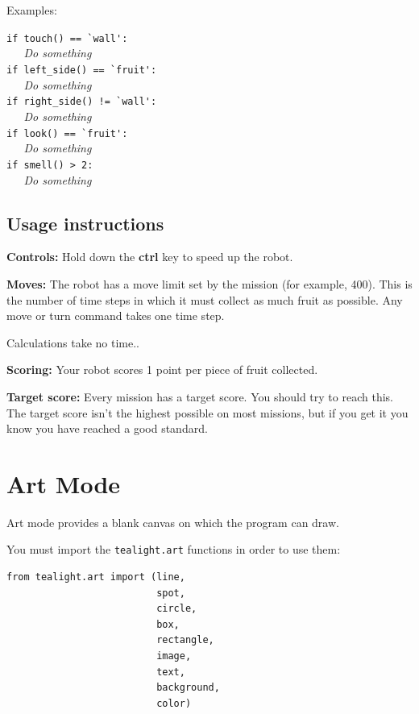 \documentclass[12pt,a4paper,twoside]{article}
\renewcommand{\_}{\texttt{\symbol{95}}}
\begin{document}
Examples:

\verb^if touch() == `wall':^\\
\verb^   ^\textit{Do something}\\

\verb^if left_side() == `fruit':^\\
\verb^   ^\textit{Do something}\\

\verb^if right_side() != `wall':^\\
\verb^   ^\textit{Do something}\\

\verb^if look() == `fruit':^\\
\verb^   ^\textit{Do something}\\

\verb^if smell() > 2:^\\
\verb^   ^\textit{Do something}\\

\subsection{Usage instructions}

\textbf{Controls:}
Hold down the \textbf{ctrl} key to speed up the robot.

\textbf{Moves:}
The robot has a move limit set by the mission (for example, 400).
This is the number of time steps in which it must collect as much fruit
as possible. Any move or turn command takes one time step.

Calculations take no time..

\textbf{Scoring:}
Your robot scores 1 point per piece of fruit collected. 

\textbf{Target score:}
Every mission has a target score. You should try to reach this.
The target score isn't the highest possible on most missions, but
if you get it you know you have reached a good standard.

\newpage
\section{Art Mode} \label{sec:art-mode}

Art mode provides a blank canvas on which the program can draw.

You must import the \verb^tealight.art^ functions in order to use them:

\begin{verbatim}
from tealight.art import (line, 
                          spot, 
                          circle, 
                          box, 
                          rectangle, 
                          image, 
                          text, 
                          background, 
                          color)
\end{verbatim}
\end{document}
